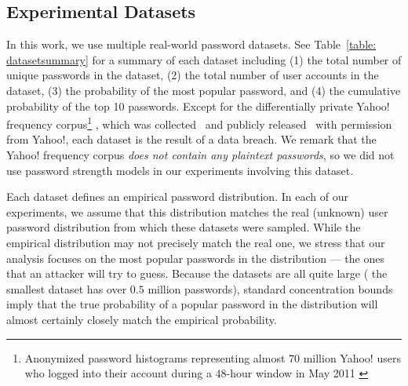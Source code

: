 \subsection{Experimental Datasets}\label{section:experiment:experiment_dataset} 
\vspace*{-\baselineskip}
In this work, we use multiple real-world password datasets. See Table~\ref{table: datasetsummary} for a summary of each dataset including (1) the total number of unique passwords in the dataset, (2) the total number of user accounts in the dataset, (3) the probability of the most popular password, and (4) the cumulative probability of the top 10 passwords. Except for the differentially private Yahoo! frequency corpus\footnote{Anonymized password histograms representing almost 70 million Yahoo! users who logged into their account during a $48$-hour window in May 2011 \cite{SP:Bonneau12}} , which was collected~\cite{SP:Bonneau12} and publicly released~\cite{NDSS:BloDatBon16} with permission from Yahoo!, each dataset is the result of a data breach. We remark that {the Yahoo!} frequency corpus \textit{does not contain any plaintext passwords}, so we did not use password strength models in our experiments involving {this} dataset.




 



Each dataset defines an empirical password distribution. In each of our experiments, we assume that this distribution matches the real (unknown) user password distribution from which these datasets were sampled. While the empirical distribution may not precisely match the real one, we stress that our analysis focuses on the most popular passwords in the distribution --- the ones that an attacker will try to guess. Because the datasets are all quite large ( the smallest dataset has over $0.5$ million passwords), standard concentration bounds imply that the true probability of a popular password in the distribution will almost certainly closely match the empirical probability.

